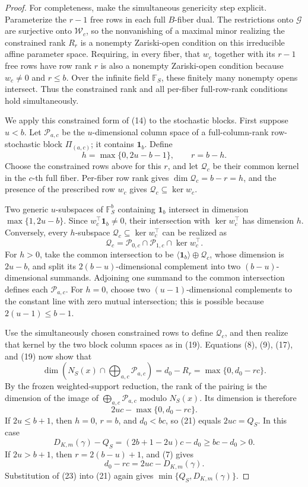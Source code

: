 \documentclass{article}
\begin{document}
\begin{proof}
For completeness, make the simultaneous genericity step explicit.  Parameterize
the \(r-1\) free rows in each full \(B\)-fiber dual.  The restrictions onto
\(\mathscr G\) are surjective onto \(\mathscr W_c\), so the nonvanishing of a
maximal minor realizing the constrained rank \(R_r\) is a nonempty Zariski-open
condition on this irreducible affine parameter space.  Requiring, in every
fiber, that \(w_c\) together with its \(r-1\) free rows have row rank \(r\) is
also a nonempty Zariski-open condition because \(w_c\ne0\) and \(r\le b\).
Over the infinite field \(\mathbb F_S\), these finitely many nonempty opens
intersect.  Thus the constrained rank and all per-fiber full-row-rank conditions
hold simultaneously.

We apply this constrained form of (14) to the stochastic blocks.  First suppose
\(u<b\).  Let
\(\mathscr P_{a,c}\) be the \(u\)-dimensional column space of a full-column-rank
row-stochastic block \(\Pi_{(a,c)}\); it contains \(\mathbf 1_b\).  Define
\[
h=\max\{0,2u-b-1\},
\qquad r=b-h.
\tag{18}
\]
Choose the constrained rows above for this \(r\), and let \(\mathscr Q_c\) be
their common kernel in the \(c\)-th full fiber.  Per-fiber row rank gives
\(\dim\mathscr Q_c=b-r=h\), and the presence of the prescribed row \(w_c\)
gives \(\mathscr Q_c\subseteq\ker w_c\).

Two generic \(u\)-subspaces of \(\mathbb F_S^b\) containing
\(\mathbf 1_b\) intersect in dimension \(\max\{1,2u-b\}\).  Since
\(w_c^\top\mathbf 1_b\ne0\), their intersection with
\(\ker w_c^\top\) has dimension \(h\).  Conversely, every \(h\)-subspace
\(\mathscr Q_c\subseteq\ker w_c^\top\) can be realized as
\[
\mathscr Q_c
=\mathscr P_{0,c}\cap\mathscr P_{1,c}\cap\ker w_c^\top.
\tag{19}
\]
For \(h>0\), take the common intersection to be
\(\langle\mathbf 1_b\rangle\oplus\mathscr Q_c\), whose dimension is
\(2u-b\), and split its \(2(b-u)\)-dimensional complement into two
\((b-u)\)-dimensional summands.  Adjoining one summand to the common intersection
defines each \(\mathscr P_{a,c}\).  For \(h=0\), choose two
\((u-1)\)-dimensional complements to the constant line with zero mutual
intersection; this is possible because \(2(u-1)\le b-1\).

Use the simultaneously chosen constrained rows to define \(\mathscr Q_c\), and
then realize that kernel by the two block column spaces as in (19).  Equations
(8), (9), (17), and (19) now show that
\[
\dim\left(
N_S(x)\cap\bigoplus_{a,c}\mathscr P_{a,c}
\right)
=d_0-R_r
=\max\{0,d_0-rc\}.
\tag{20}
\]
By the frozen weighted-support reduction, the rank of the pairing is the
dimension of the image of \(\bigoplus_{a,c}\mathscr P_{a,c}\) modulo
\(N_S(x)\).  Its dimension is therefore
\[
2uc-\max\{0,d_0-rc\}.
\tag{21}
\]
If \(2u\le b+1\), then \(h=0\), \(r=b\), and \(d_0<bc\), so (21) equals
\(2uc=Q_S\).  In this case
\[
D_{K,m}(\gamma)-Q_S
=(2b+1-2u)c-d_0\ge bc-d_0>0.
\tag{22}
\]
If \(2u>b+1\), then \(r=2(b-u)+1\), and (7) gives
\[
d_0-rc=2uc-D_{K,m}(\gamma).
\tag{23}
\]
Substitution of (23) into (21) again gives
\(\min\{Q_S,D_{K,m}(\gamma)\}\).


\end{proof}
\end{document}
